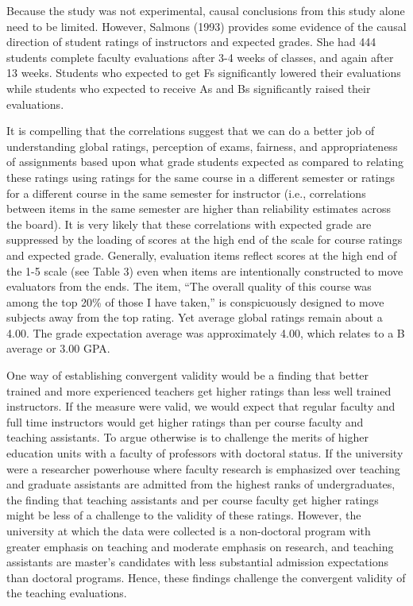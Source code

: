 \documentclass[man]{apa6}
\theoremstyle{definition}
\theoremstyle{definition}
\theoremstyle{definition}
\theoremstyle{remark}
\begin{document}
Because the study was not experimental, causal conclusions from this
study alone need to be limited. However, Salmons (1993) provides some
evidence of the causal direction of student ratings of instructors and
expected grades. She had 444 students complete faculty evaluations after
3-4 weeks of classes, and again after 13 weeks. Students who expected to
get Fs significantly lowered their evaluations while students who
expected to receive As and Bs significantly raised their evaluations.

It is compelling that the correlations suggest that we can do a better
job of understanding global ratings, perception of exams, fairness, and
appropriateness of assignments based upon what grade students expected
as compared to relating these ratings using ratings for the same course
in a different semester or ratings for a different course in the same
semester for instructor (i.e., correlations between items in the same
semester are higher than reliability estimates across the board). It is
very likely that these correlations with expected grade are suppressed
by the loading of scores at the high end of the scale for course ratings
and expected grade. Generally, evaluation items reflect scores at the
high end of the 1-5 scale (see Table 3) even when items are
intentionally constructed to move evaluators from the ends. The item,
\enquote{The overall quality of this course was among the top 20\% of
those I have taken,} is conspicuously designed to move subjects away
from the top rating. Yet average global ratings remain about a 4.00. The
grade expectation average was approximately 4.00, which relates to a B
average or 3.00 GPA.

One way of establishing convergent validity would be a finding that
better trained and more experienced teachers get higher ratings than
less well trained instructors. If the measure were valid, we would
expect that regular faculty and full time instructors would get higher
ratings than per course faculty and teaching assistants. To argue
otherwise is to challenge the merits of higher education units with a
faculty of professors with doctoral status. If the university were a
researcher powerhouse where faculty research is emphasized over teaching
and graduate assistants are admitted from the highest ranks of
undergraduates, the finding that teaching assistants and per course
faculty get higher ratings might be less of a challenge to the validity
of these ratings. However, the university at which the data were
collected is a non-doctoral program with greater emphasis on teaching
and moderate emphasis on research, and teaching assistants are master's
candidates with less substantial admission expectations than doctoral
programs. Hence, these findings challenge the convergent validity of the
teaching evaluations.
\end{document}
